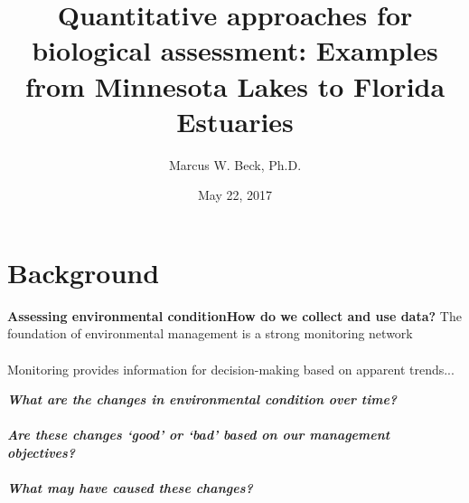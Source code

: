 \documentclass[serif]{beamer}\usepackage[]{graphicx}\usepackage[]{color}
\newcommand{\emtxt}[1]{\textbf{\textit{#1}}}
\begin{document}
\title[Evaluating water quality]{\textbf{Quantitative approaches for biological assessment: Examples from Minnesota Lakes to Florida Estuaries}}
\author[M. Beck]{Marcus W. Beck, Ph.D.}


\date{May 22, 2017}


\begin{frame}[shrink]
\titlepage
\end{frame}

\section{Background}

\begin{frame}{\textbf{Assessing environmental condition}}{\textbf{How do we collect and use data?}}
\onslide<+->
The foundation of environmental management is a strong monitoring network \scriptsize \cite{NRC90}\\~\\
\normalsize
Monitoring provides information for decision-making based on apparent trends...
\vspace{0.2in}
\begin{center}
\emtxt{What are the changes in environmental condition over time?}\\~\\
\emtxt{Are these changes `good' or `bad' based on our management objectives?}\\~\\
\emtxt{What may have caused these changes?}
\end{center}
\end{frame}
\end{document}
